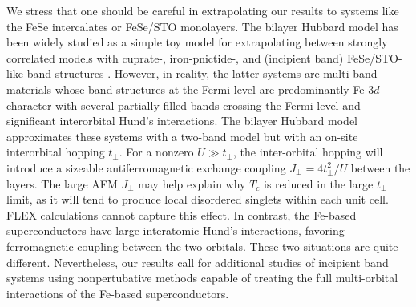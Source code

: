 \documentclass[prb,twocolumn,amsmath,amssymb,superscriptaddress,floatfix,nofootinbib]{revtex4-2}
\begin{document}
We stress that one should be careful in extrapolating our results to systems like the FeSe intercalates or FeSe/STO monolayers. The bilayer Hubbard model has been widely studied as a simple toy model for extrapolating between strongly correlated models with cuprate-, iron-pnictide-, and (incipient band) FeSe/STO-like band structures \cite{Maier2011, Mishra2016, Kuroki2008,  RademakerEnhanced2021, PelliciariRIXS2020}. However, in reality, the latter systems are multi-band materials whose band structures at the Fermi level are predominantly Fe $3d$ character with several partially filled bands crossing the Fermi level and significant interorbital Hund's interactions. The bilayer Hubbard model approximates these systems with a two-band model but with an on-site interorbital hopping $t_\perp$. For a nonzero $U \gg t_\perp$, the inter-orbital hopping will introduce a sizeable antiferromagnetic exchange coupling $J_\perp = 4t^2_\perp/U$ between the layers. The large AFM $J_\perp$ may help explain why $T_c$ is reduced in the large $t_\perp$ limit, as it will tend to produce local disordered singlets within each unit cell. FLEX calculations cannot capture this effect. In contrast, the Fe-based superconductors have large interatomic Hund's interactions, favoring ferromagnetic coupling between the two orbitals. These two situations are quite different. Nevertheless, our results call for additional studies of incipient band systems using nonpertubative methods capable of treating the full multi-orbital interactions of the Fe-based superconductors. 
\end{document}
